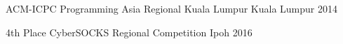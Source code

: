 



\begin{cvhonors}

  \cvhonor
    {}
    {ACM-ICPC Programming Asia Regional Kuala Lumpur} %
    {Kuala Lumpur} %
    {2014} %

  \cvhonor
    {4th Place} %
    {CyberSOCKS Regional Competition} %
    {Ipoh} %
    {2016} %

\end{cvhonors}




